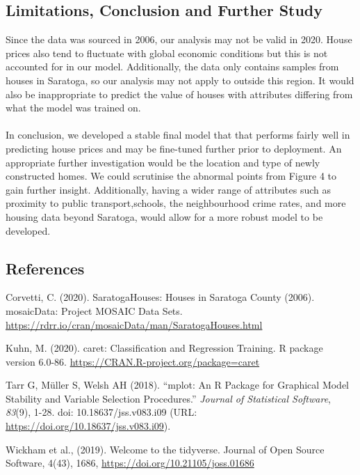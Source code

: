 \documentclass[letterpaper,9pt,twocolumn,twoside,]{pinp}
\begin{document}
\hypertarget{limitations-conclusion-and-further-study}{%
\subsection{Limitations, Conclusion and Further
Study}\label{limitations-conclusion-and-further-study}}

\hfill\break
Since the data was sourced in 2006, our analysis may not be valid in
2020. House prices also tend to fluctuate with global economic
conditions but this is not accounted for in our model. Additionally, the
data only contains samples from houses in Saratoga, so our analysis may
not apply to outside this region. It would also be inappropriate to
predict the value of houses with attributes differing from what the
model was trained on.\\
~\\
\noindent In conclusion, we developed a stable final model that that
performs fairly well in predicting house prices and may be fine-tuned
further prior to deployment. An appropriate further investigation would
be the location and type of newly constructed homes. We could scrutinise
the abnormal points from Figure 4 to gain further insight. Additionally,
having a wider range of attributes such as proximity to public
transport,schools, the neighbourhood crime rates, and more housing data
beyond Saratoga, would allow for a more robust model to be developed.

\hypertarget{references}{%
\subsection{References}\label{references}}

\hfill\break
\indent Corvetti, C. (2020). SaratogaHouses: Houses in Saratoga County
(2006). mosaicData: Project MOSAIC Data Sets.
\url{https://rdrr.io/cran/mosaicData/man/SaratogaHouses.html}

Kuhn, M. (2020). caret: Classification and Regression Training. R
package version 6.0-86. \url{https://CRAN.R-project.org/package=caret}

Tarr G, Müller S, Welsh AH (2018). ``mplot: An R Package for Graphical
Model Stability and Variable Selection Procedures.'' \emph{Journal of
Statistical Software}, \emph{83}(9), 1-28. doi: 10.18637/jss.v083.i09
(URL: \url{https://doi.org/10.18637/jss.v083.i09}).

Wickham et al., (2019). Welcome to the tidyverse. Journal of Open Source
Software, 4(43), 1686, \url{https://doi.org/10.21105/joss.01686}
\end{document}
